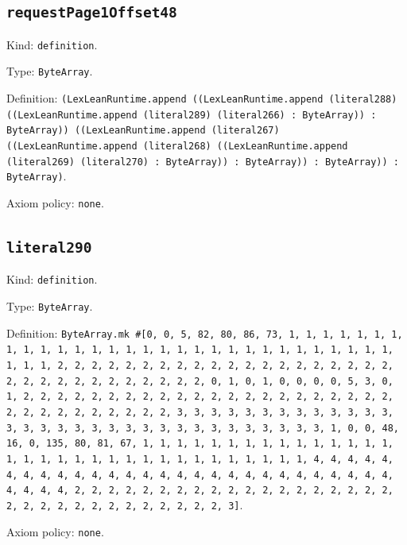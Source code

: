 \documentclass[11pt]{article}
\begin{document}
\subsection*{\texttt{requestPage1Offset48}}
\noindent Kind: \texttt{definition}.\par
\noindent Type: \texttt{ByteArray}.\par
\noindent Definition: \texttt{(LexLeanRuntime.append ((LexLeanRuntime.append (literal288) ((LexLeanRuntime.append (literal289) (literal266) : ByteArray)) : ByteArray)) ((LexLeanRuntime.append (literal267) ((LexLeanRuntime.append (literal268) ((LexLeanRuntime.append (literal269) (literal270) : ByteArray)) : ByteArray)) : ByteArray)) : ByteArray)}.\par
\noindent Axiom policy: \texttt{none}.\par
\subsection*{\texttt{literal290}}
\noindent Kind: \texttt{definition}.\par
\noindent Type: \texttt{ByteArray}.\par
\noindent Definition: \texttt{ByteArray.mk \#[0, 0, 5, 82, 80, 86, 73, 1, 1, 1, 1, 1, 1, 1, 1, 1, 1, 1, 1, 1, 1, 1, 1, 1, 1, 1, 1, 1, 1, 1, 1, 1, 1, 1, 1, 1, 1, 1, 1, 1, 2, 2, 2, 2, 2, 2, 2, 2, 2, 2, 2, 2, 2, 2, 2, 2, 2, 2, 2, 2, 2, 2, 2, 2, 2, 2, 2, 2, 2, 2, 2, 2, 0, 1, 0, 1, 0, 0, 0, 0, 5, 3, 0, 1, 2, 2, 2, 2, 2, 2, 2, 2, 2, 2, 2, 2, 2, 2, 2, 2, 2, 2, 2, 2, 2, 2, 2, 2, 2, 2, 2, 2, 2, 2, 2, 2, 3, 3, 3, 3, 3, 3, 3, 3, 3, 3, 3, 3, 3, 3, 3, 3, 3, 3, 3, 3, 3, 3, 3, 3, 3, 3, 3, 3, 3, 3, 3, 3, 1, 0, 0, 48, 16, 0, 135, 80, 81, 67, 1, 1, 1, 1, 1, 1, 1, 1, 1, 1, 1, 1, 1, 1, 1, 1, 1, 1, 1, 1, 1, 1, 1, 1, 1, 1, 1, 1, 1, 1, 1, 1, 1, 4, 4, 4, 4, 4, 4, 4, 4, 4, 4, 4, 4, 4, 4, 4, 4, 4, 4, 4, 4, 4, 4, 4, 4, 4, 4, 4, 4, 4, 4, 4, 4, 2, 2, 2, 2, 2, 2, 2, 2, 2, 2, 2, 2, 2, 2, 2, 2, 2, 2, 2, 2, 2, 2, 2, 2, 2, 2, 2, 2, 2, 2, 2, 2, 3]}.\par
\noindent Axiom policy: \texttt{none}.\par
\end{document}
